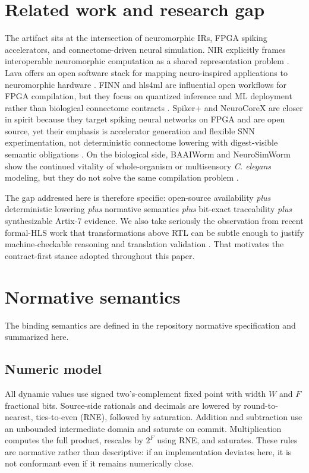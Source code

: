 \documentclass[11pt]{article}
\begin{document}
\section{Related work and research gap}
The artifact sits at the intersection of neuromorphic IRs, FPGA spiking accelerators, and connectome-driven neural simulation. NIR explicitly frames interoperable neuromorphic computation as a shared representation problem \cite{pedersen2024nir}. Lava offers an open software stack for mapping neuro-inspired applications to neuromorphic hardware \cite{lava}. FINN and hls4ml are influential open workflows for FPGA compilation, but they focus on quantized inference and ML deployment rather than biological connectome contracts \cite{finn,hls4ml2021}. Spiker+ and NeuroCoreX are closer in spirit because they target spiking neural networks on FPGA and are open source, yet their emphasis is accelerator generation and flexible SNN experimentation, not deterministic connectome lowering with digest-visible semantic obligations \cite{spikerplus2024,neurocorex2025}. On the biological side, BAAIWorm and NeuroSimWorm show the continued vitality of whole-organism or multisensory \emph{C. elegans} modeling, but they do not solve the same compilation problem \cite{baaiworm2024,neurosimworm2025}.

The gap addressed here is therefore specific: open-source availability \emph{plus} deterministic lowering \emph{plus} normative semantics \emph{plus} bit-exact traceability \emph{plus} synthesizable Artix-7 evidence. We also take seriously the observation from recent formal-HLS work that transformations above RTL can be subtle enough to justify machine-checkable reasoning and translation validation \cite{pouchet2024hlsverify}. That motivates the contract-first stance adopted throughout this paper.

\section{Normative semantics}
The binding semantics are defined in the repository normative specification and summarized here.

\subsection{Numeric model}
All dynamic values use signed two's-complement fixed point with width $W$ and $F$ fractional bits. Source-side rationals and decimals are lowered by round-to-nearest, ties-to-even (RNE), followed by saturation. Addition and subtraction use an unbounded intermediate domain and saturate on commit. Multiplication computes the full product, rescales by $2^F$ using RNE, and saturates. These rules are normative rather than descriptive: if an implementation deviates here, it is not conformant even if it remains numerically close.
\end{document}
